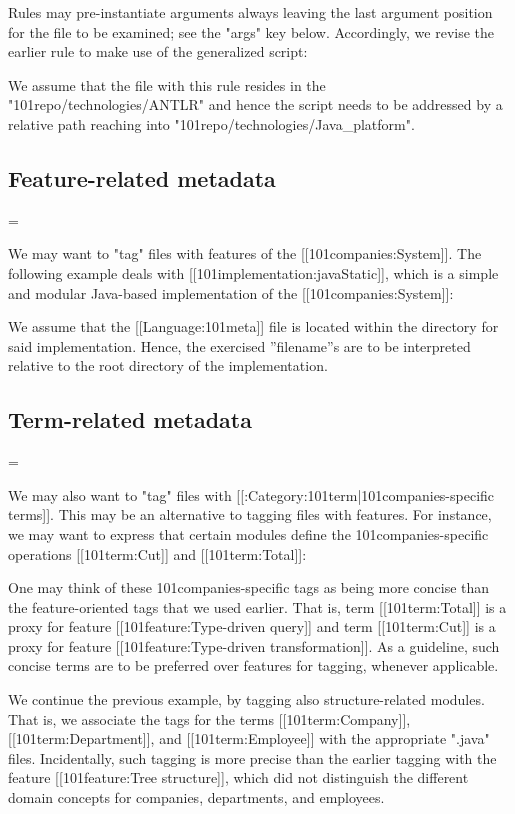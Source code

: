 Rules may pre-instantiate arguments always leaving the last argument position for the file to be examined; see the "args" key below. Accordingly, we revise the earlier rule to make use of the generalized script:



We assume that the file with this rule resides in the "101repo/technologies/ANTLR" and hence the script needs to be addressed by a relative path reaching into "101repo/technologies/Java_platform".
\subsection{Feature-related metadata}
=

We may want to "tag" files with features of the [[101companies:System]]. The following example deals with [[101implementation:javaStatic]], which is a simple and modular Java-based implementation of the [[101companies:System]]:



We assume that the [[Language:101meta]] file is located within the directory for said implementation. Hence, the exercised ''filename''s are to be interpreted relative to the root directory of the implementation.
\subsection{Term-related metadata}
=

We may also want to "tag" files with [[:Category:101term|101companies-specific terms]]. This may be an alternative to tagging files with features. For instance, we may want to express that certain modules define the 101companies-specific operations [[101term:Cut]] and [[101term:Total]]:



One may think of these 101companies-specific tags as being more concise than the feature-oriented tags that we used earlier. That is, term [[101term:Total]] is a proxy for feature [[101feature:Type-driven query]] and term [[101term:Cut]] is a proxy for feature  [[101feature:Type-driven transformation]]. As a guideline, such concise terms are to be preferred over features for tagging, whenever applicable.

We continue the previous example, by tagging also structure-related modules. That is, we associate the tags for the terms [[101term:Company]], [[101term:Department]], and [[101term:Employee]] with the appropriate ".java" files. Incidentally, such tagging is more precise than the earlier tagging with the feature [[101feature:Tree structure]], which did not distinguish the different domain concepts for companies, departments, and employees.

